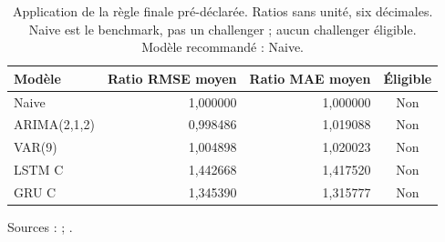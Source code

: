 \begin{table}[!htbp]
\centering
\caption{Application de la règle finale pré-déclarée. Ratios sans unité, six décimales. Naive est le benchmark, pas un challenger ; aucun challenger éligible. Modèle recommandé : Naive.}
\label{tab:recommendation}
\small
\setlength{\tabcolsep}{4pt}
\renewcommand{\arraystretch}{1.16}
\begin{tabularx}{\linewidth}{Xrrc}
\toprule
\textbf{Modèle} & \textbf{Ratio RMSE moyen} & \textbf{Ratio MAE moyen} & \textbf{Éligible} \\
\midrule
Naive & 1,000000 & 1,000000 & Non \\
ARIMA(2,1,2) & 0,998486 & 1,019088 & Non \\
VAR(9) & 1,004898 & 1,020023 & Non \\
LSTM C & 1,442668 & 1,417520 & Non \\
GRU C & 1,345390 & 1,315777 & Non \\
\bottomrule
\end{tabularx}
\par\smallskip
\begin{minipage}{\linewidth}\footnotesize Sources :  ; .
\end{minipage}
\end{table}
